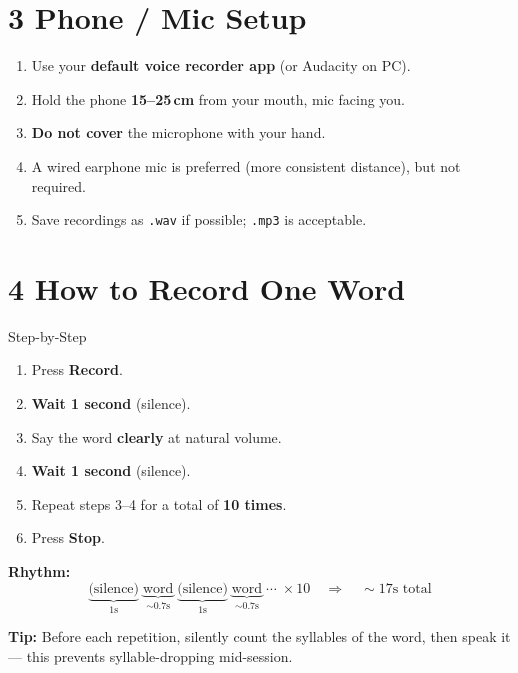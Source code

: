 \documentclass[11pt,a4paper]{article}
\begin{document}
\section*{3 \quad Phone / Mic Setup}

\begin{enumerate}[leftmargin=1.5em, itemsep=4pt]
  \item Use your \textbf{default voice recorder app} (or Audacity on PC).
  \item Hold the phone \textbf{15--25\,cm} from your mouth, mic facing you.
  \item \textbf{Do not cover} the microphone with your hand.
  \item A wired earphone mic is preferred (more consistent distance), but not required.
  \item Save recordings as \texttt{.wav} if possible; \texttt{.mp3} is acceptable.
\end{enumerate}

\section*{4 \quad How to Record One Word}

\begin{infobox}{Step-by-Step}
\begin{enumerate}[leftmargin=1.5em, itemsep=4pt]
  \item Press \textbf{Record}.
  \item \textbf{Wait 1 second} (silence).
  \item Say the word \textbf{clearly} at natural volume.
  \item \textbf{Wait 1 second} (silence).
  \item Repeat steps 3--4 for a total of \textbf{10 times}.
  \item Press \textbf{Stop}.
\end{enumerate}

\vspace{4pt}
\textbf{Rhythm:}
\[
  \underbrace{\text{(silence)}}_{1\text{s}}
  \;\underbrace{\text{word}}_{\sim 0.7\text{s}}
  \;\underbrace{\text{(silence)}}_{1\text{s}}
  \;\underbrace{\text{word}}_{\sim 0.7\text{s}}
  \;\cdots\; \times 10
  \quad\Rightarrow\quad \sim 17\text{s total}
\]

\vspace{4pt}
\textbf{Tip:} Before each repetition, silently count the syllables of the word,
then speak it --- this prevents syllable-dropping mid-session.
\end{infobox}
\end{document}
